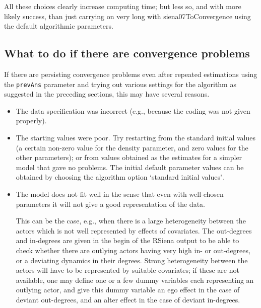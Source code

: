 \documentclass[a4paper,fleqn,11pt]{article}
\newcommand{\+}{\, + \,}
\newcommand{\sfn}[1]{\textsf{#1}}
\newcommand{\RS}{{\sf \textsf{RSiena} }}
\begin{document}
All these choices clearly increase computing time; but less so, and with
more likely success, than just carrying on very long with \sfn{siena07ToConvergence}
using the default algorithmic parameters.



\subsection{What to do if there are convergence problems}
\label{S_conv}

If there are persisting convergence problems even after repeated estimations
using the \texttt{prevAns} parameter and trying out various
settings for the algorithm as suggested in the preceding sections,
this may have several reasons.
\begin{itemize}
\item The data specification was incorrect (e.g., because the coding
      was not given properly).
\item The starting values were poor.
      Try restarting from the standard initial values
      (a certain non-zero value for the
      density parameter, and zero values for the other parameters);
      or from values obtained as the estimates for a simpler model
      that gave no problems.
      The initial default parameter values can be obtained
      by choosing the algorithm option `standard initial values".

\item The model does not fit well in the sense that even with well-chosen
      parameters it will not give a good representation of the data.

      This can be the case, e.g., when there is a large heterogeneity
      between the actors which is not well represented by effects
      of covariates.
      The out-degrees and in-degrees are given in the begin of the \RS output
      to be able to check whether there are outlying actors having very high
      in- or out-degrees, or a deviating dynamics in their degrees.
      Strong heterogeneity between the actors will have to be
      represented by suitable covariates; if these are not available,
      one may define one or a few dummy variables each representing
      an outlying actor, and give this dummy variable an ego effect
      in the case of deviant out-degrees, and an alter effect in the
      case of deviant in-degrees.


\end{itemize}
\end{document}
